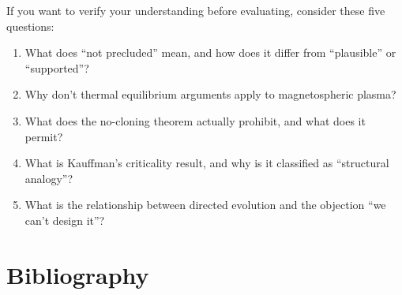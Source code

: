 If you want to verify your understanding before evaluating, consider these five questions:

\begin{enumerate}
\item What does ``not precluded'' mean, and how does it differ from ``plausible'' or ``supported''?
\item Why don't thermal equilibrium arguments apply to magnetospheric plasma?
\item What does the no-cloning theorem actually prohibit, and what does it permit?
\item What is Kauffman's criticality result, and why is it classified as ``structural analogy''?
\item What is the relationship between directed evolution and the objection ``we can't design it''?
\end{enumerate}

\section*{Bibliography}

